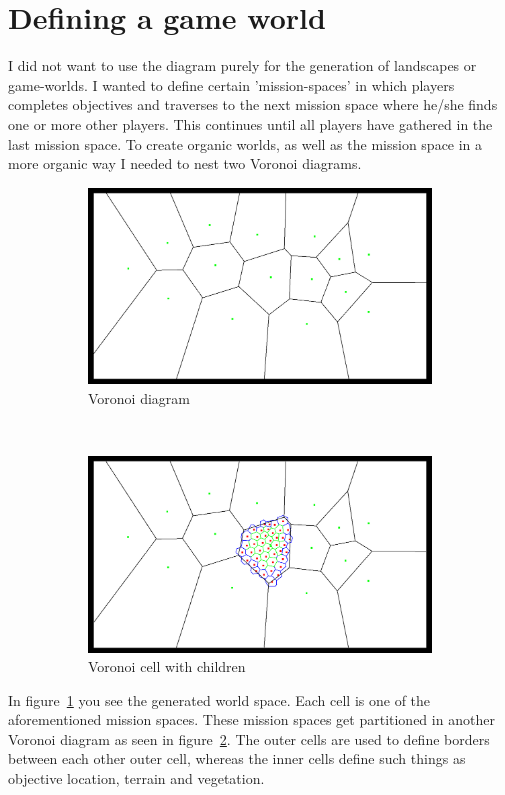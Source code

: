 \documentclass[11pt,a4paper,twocolumn]{article}
\begin{document}
\section{Defining a game world}
I did not want to use the diagram purely for the generation of landscapes or game-worlds. I wanted to define certain 'mission-spaces' in which players completes objectives and traverses to the next mission space where he/she finds one or more other players. This continues until all players have gathered in the last mission space. To create organic worlds, as well as the mission space in a more organic way I needed to nest two Voronoi diagrams.
\begin{figure}[ht]
	\centering
	\begin{subfigure}[b]{0.5\textwidth}
		\centering
		\includegraphics[width=\textwidth]{images/voronoipccs.png}
		\caption{Voronoi diagram}\label{fig:pccs:voronoiRelaxed}
	\end{subfigure}		
	~
	\begin{subfigure}[b]{0.5\textwidth}
		\centering
		\includegraphics[width=\textwidth]{images/voronoi2pccs.png}
		\caption{Voronoi cell with children} \label{fig:pccs:voronoiNested}
	\end{subfigure}		
	\caption{ }\label{fig:vvn}
\end{figure}
In figure~\ref{fig:pccs:voronoiRelaxed} you see the generated world space. Each cell is one of the aforementioned mission spaces. These mission spaces get partitioned in another Voronoi diagram as seen in figure~\ref{fig:pccs:voronoiNested}. The outer cells are used to define borders between each other outer cell, whereas the inner cells define such things as objective location, terrain and vegetation.
\end{document}
